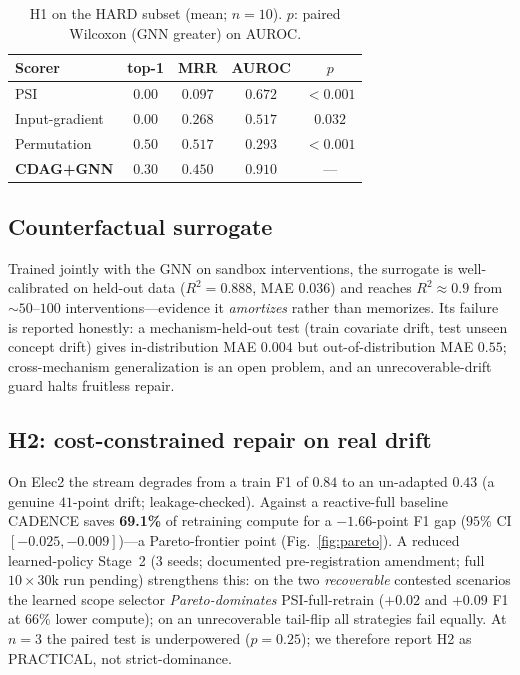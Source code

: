 \documentclass[conference]{IEEEtran}
\begin{document}
\begin{table}[t]
\centering\footnotesize
\caption{H1 on the HARD subset (mean; $n{=}10$). $p$: paired Wilcoxon (GNN
greater) on AUROC.}
\label{tab:h1}
\setlength{\tabcolsep}{5pt}
\begin{tabular}{@{}lcccc@{}}
\toprule
\textbf{Scorer} & \textbf{top-1} & \textbf{MRR} & \textbf{AUROC} & \textbf{$p$}\\
\midrule
PSI & $0.00$ & $0.097$ & $0.672$ & $<0.001$\\
Input-gradient & $0.00$ & $0.268$ & $0.517$ & $0.032$\\
Permutation & $\mathbf{0.50}$ & $\mathbf{0.517}$ & $0.293$ & $<0.001$\\
\textbf{CDAG+GNN} & $0.30$ & $0.450$ & $\mathbf{0.910}$ & ---\\
\bottomrule
\end{tabular}
\end{table}

\subsection{Counterfactual surrogate}\label{sec:sur}
Trained jointly with the GNN on sandbox interventions, the surrogate is
well-calibrated on held-out data ($R^2{=}0.888$, MAE $0.036$) and reaches
$R^2\!\approx\!0.9$ from $\sim\!50$--$100$ interventions---evidence it
\emph{amortizes} rather than memorizes. Its failure is reported honestly: a
mechanism-held-out test (train covariate drift, test unseen concept drift) gives
in-distribution MAE $0.004$ but out-of-distribution MAE $0.55$; cross-mechanism
generalization is an open problem, and an unrecoverable-drift guard halts
fruitless repair.

\subsection{H2: cost-constrained repair on real drift}\label{sec:h2}
On Elec2 the stream degrades from a train F1 of $0.84$ to an un-adapted $0.43$
(a genuine $41$-point drift; leakage-checked). Against a reactive-full baseline
CADENCE saves \textbf{69.1\%} of retraining compute for a $\mathbf{-1.66}$-point
F1 gap ($95\%$ CI $[-0.025,-0.009]$)---a Pareto-frontier point
(Fig.~\ref{fig:pareto}). A reduced learned-policy Stage~2 (3 seeds; documented
pre-registration amendment; full $10{\times}30$k run pending) strengthens this:
on the two \emph{recoverable} contested scenarios the learned scope selector
\emph{Pareto-dominates} PSI-full-retrain ($+0.02$ and $+0.09$ F1 at $66\%$ lower
compute); on an unrecoverable tail-flip all strategies fail equally. At $n{=}3$
the paired test is underpowered ($p{=}0.25$); we therefore report H2 as
PRACTICAL, not strict-dominance.
\end{document}
